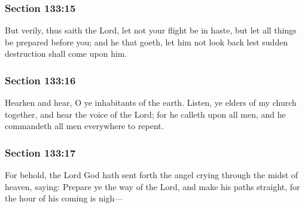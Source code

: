 	\subsubsection{Section 133:15} %
		\label{DC133-15}

		But verily, thus saith the Lord, let not your flight be in haste, but let all things be prepared before you; and he that goeth, let him not look back lest sudden destruction shall come upon him.


	\subsubsection{Section 133:16} %
		\label{DC133-16}

		Hearken and hear, O ye inhabitants of the earth.  Listen, ye elders of my church together, and hear the voice of the Lord; for he calleth upon all men, and he commandeth all men everywhere to repent.


	\subsubsection{Section 133:17} %
		\label{DC133-17}

		For behold, the Lord God hath sent forth the angel crying through the midst of heaven, saying: Prepare ye the way of the Lord, and make his paths straight, for the hour of his coming is nigh---


